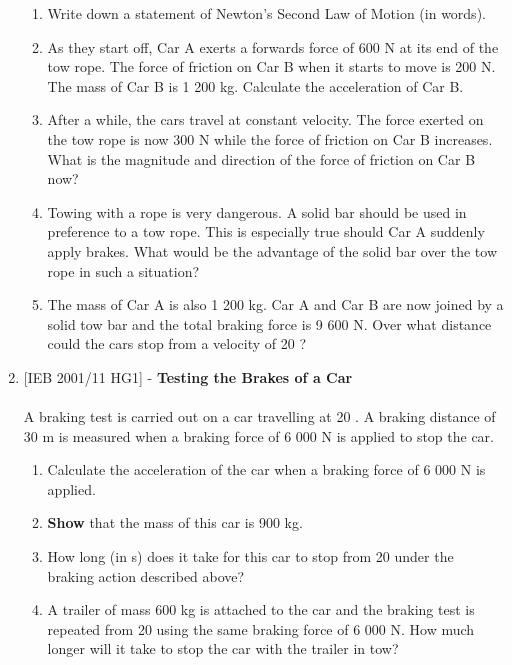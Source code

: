 \begin{eocexercises}{}
\begin{enumerate}
{\begin{enumerate}
\item{Write down a statement of Newton's Second Law of Motion (in words).}
\item{As they start off, Car A exerts a forwards force of 600 N at its end of the tow rope. The force of friction on Car B when it starts to move is 200 N. The mass of Car B is 1 200 kg. Calculate the acceleration of Car B.}
\item{After a while, the cars travel at constant velocity. The force exerted on the tow rope is now 300 N while the force of friction on Car B increases. What is the magnitude and direction of the force of friction on Car B now?}
\item{Towing with a rope is very dangerous. A solid bar should be used in preference to a tow rope. This is especially true should Car A suddenly apply brakes. What would be the advantage of the solid bar over the tow rope in such a situation?}
\item{The mass of Car A is also 1 200 kg. Car A and Car B are now joined by a solid tow bar and the total braking force is 9 600 N. Over what distance could the cars stop from a velocity of 20 \ms?}
\end{enumerate}}

\item{[IEB 2001/11 HG1] - \textbf{Testing the Brakes of a Car}\\
\\
A braking test is carried out on a car travelling at 20 \ms. A braking distance of 30 m is measured when a braking force of 6 000 N is applied to stop the car.
\begin{enumerate}
\item{Calculate the acceleration of the car when a braking force of 6 000 N is applied.}
\item{\textbf{Show} that the mass of this car is 900 kg.}
\item{How long (in s) does it take for this car to stop from 20 \ms under the braking action described above?}
\item{ A trailer of mass 600 kg is attached to the car and the braking test is repeated from 20 \ms using the same braking force of 6 000 N. How much longer will it take to stop the car with the trailer in tow?}
\end{enumerate}}


\end{enumerate}
\end{eocexercises}
